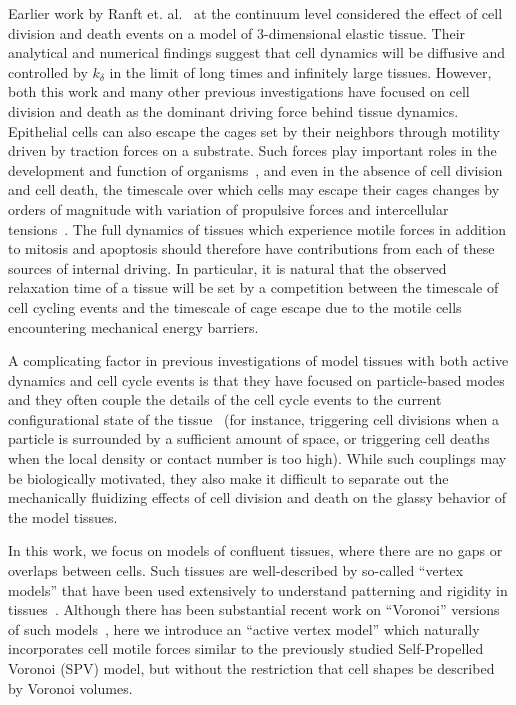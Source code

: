 \documentclass[
reprint
,aps
,amssymb
,amsmath
,superscriptaddress
]{revtex4-1}
\begin{document}
Earlier work by Ranft et. al.~\cite{Ranft2010} at the continuum level considered the effect of cell division and death events on a model of 3-dimensional elastic tissue. Their analytical and numerical findings suggest that cell dynamics will be diffusive and controlled by $k_\delta$ in the limit of long times and infinitely large tissues. However, both this work and many other previous investigations have focused on cell division and death as the dominant driving force behind tissue dynamics. Epithelial cells can also escape the cages set by their neighbors through motility driven by traction forces on a substrate. Such forces play important roles in the development and function of organisms~\cite{Puliafito2012, Martin2004, Trepat2009, Giavazzi2017-1, Giavazzi2017-2}, and even in the absence of cell division and cell death, the timescale over which cells may escape their cages changes by orders of magnitude with variation of propulsive forces and intercellular tensions~\cite{Henkes2011, Berthier2013, Berthier2014, Bi2016, Giavazzi2017-2}. The full dynamics of tissues which experience motile forces in addition to mitosis and apoptosis should therefore have contributions from each of these sources of internal driving. In particular, it is natural that the observed relaxation time of a tissue will be set by a competition between the timescale of cell cycling events and the timescale of cage escape due to the motile cells encountering mechanical energy barriers.

A complicating factor in previous investigations of model tissues with both active dynamics and cell cycle events is that they have focused on particle-based modes and they often couple the details of the cell cycle events to the current configurational state of the tissue~\cite{Matoz-Fernandez2017-1,Matoz-Fernandez2017-2, Ranft2010} (for instance, triggering cell divisions when a particle is surrounded by a sufficient amount of space, or triggering cell deaths when the local density or contact number is too high). While such couplings may be biologically motivated, they also make it difficult to separate out the mechanically fluidizing effects of cell division and death on the glassy behavior of the model tissues. 

In this work, we focus on models of confluent tissues, where there are no gaps or overlaps between cells.  Such tissues are well-described by so-called ``vertex models'' that have been used extensively to understand patterning and rigidity in tissues~\cite{Farhadifar2007,Hufnagel2007,Staple2010, Bi2014, Bi2015, Merkel2017}. Although there has been substantial recent work on ``Voronoi'' versions of such models~\cite{Bi2016,Barton2017}, here we introduce an ``active vertex model'' which naturally incorporates cell motile forces similar to the previously studied Self-Propelled Voronoi (SPV) model, but without the restriction that cell shapes be described by Voronoi volumes.
\end{document}
